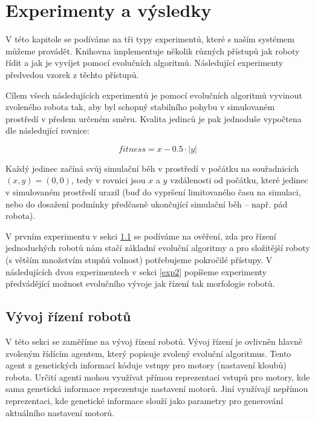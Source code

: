 
\chapter{Experimenty a výsledky}

V této kapitole se podíváme na tři typy experimentů, které s naším systémem
můžeme provádět. Knihovna implementuje několik různých přístupů jak roboty
řídit a jak je vyvíjet pomocí evolučních algoritmů. Následující experimenty
předvedou vzorek z těchto přístupů. 

Cílem všech následujících experimentů je pomocí evolučních algoritmů vyvinout
zvoleného robota tak, aby byl schopný stabilního pohybu v simulovaném prostředí
v předem určeném směru. Kvalita jedinců je pak jednoduše vypočtena dle
následující rovnice:

\begin{equation} \label{fitness_calc}
    fitness = x - 0.5\cdot|y|
\end{equation}

Každý jedinec začíná svůj simulační běh v prostředí v počátku na souřadnicích
$(x,y) = (0,0)$, tedy v rovnici \label{fitness_calc} jsou $x$ a $y$ vzdálenosti
od počátku, které jedinec v simulovaném prostředí urazil (buď do vypršení
limitovaného času na simulaci, nebo do dosažení podmínky předčasně ukončující
simulační běh -- např. pád robota).

V prvním experimentu v sekci \ref{exp1} se podíváme na ověření, zda pro řízení
jednoduchých robotů nám stačí základní evoluční algoritmy a pro složitější
roboty (s větším množstvím stupňů volnost) potřebujeme pokročilé přístupy.
V následujících dvou experimentech v sekci \ref{exp2} popíšeme experimenty
předvádějící možnost evolučního vývoje jak řízení tak morfologie robotů.

\section{Vývoj řízení robotů} \label{exp1}

V této sekci se zaměříme na vývoj řízení robotů. Vývoj řízení je ovlivněn
hlavně zvoleným řídícím agentem, který popisuje zvolený evoluční algoritmus.
Tento agent z genetických informací kóduje vstupy pro motory (nastavení kloubů)
robota. Určití agenti mohou využívat přímou reprezentaci vstupů pro motory, kde
sama genetická informace reprezentuje nastavení motorů. Jiní využívají nepřímou
reprezentaci, kde genetické informace slouží jako parametry pro generování
aktuálního nastavení motorů.

